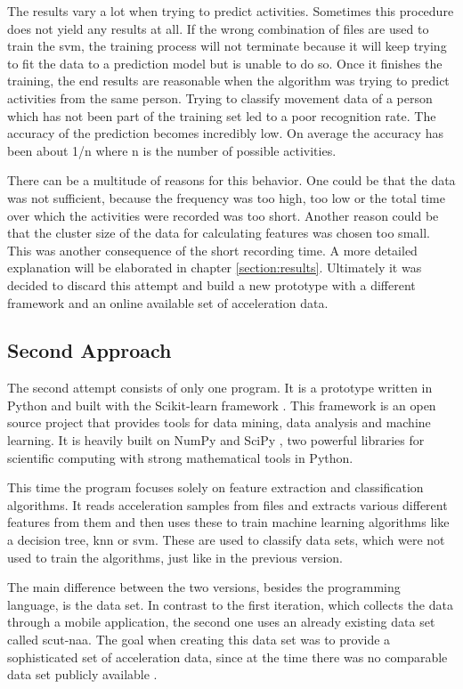 The results vary a lot when trying to predict activities. Sometimes this procedure does not yield any results at all. If the wrong combination of files are used to train the \gls{svm}, the training process will not terminate because it will keep trying to fit the data to a prediction model but is unable to do so. Once it finishes the training, the end results are reasonable when the algorithm was trying to predict activities from the same person. Trying to classify movement data of a person which has not been part of the training set led to a poor recognition rate. The accuracy of the prediction becomes incredibly low. On average the accuracy has been about 1/n where n is the number of possible activities.

There can be a multitude of reasons for this behavior. One could be that the data was not sufficient, because the frequency was too high, too low or the total time over which the activities were recorded was too short. Another reason could be that the cluster size of the data for calculating features was chosen too small. This was another consequence of the short recording time. A more detailed explanation will be elaborated in chapter \ref{section:results}. Ultimately it was decided to discard this attempt and build a new prototype with a different framework and an online available set of acceleration data.

\subsection{Second Approach}

The second attempt consists of only one program. It is a prototype written in Python and built with the Scikit-learn framework \autocite[]{scikit-learn}. This framework is an open source project that provides tools for data mining, data analysis and machine learning. It is heavily built on NumPy \autocite[]{NumPy} and SciPy \autocite[]{SciPy}, two powerful libraries for scientific computing with strong mathematical tools in Python.

This time the program focuses solely on feature extraction and classification algorithms. It reads acceleration samples from files and extracts various different features from them and then uses these to train machine learning algorithms like a decision tree, \gls{knn} or \gls{svm}. These are used to classify data sets, which were not used to train the algorithms, just like in the previous version.

The main difference between the two versions, besides the programming language, is the data set. In contrast to the first iteration, which collects the data through a mobile application, the second one uses an already existing data set called \gls{scut-naa}. The goal when creating this data set was to provide a sophisticated set of acceleration data, since at the time there was no comparable data set publicly available \autocite[]{xue2010naturalistic}.

